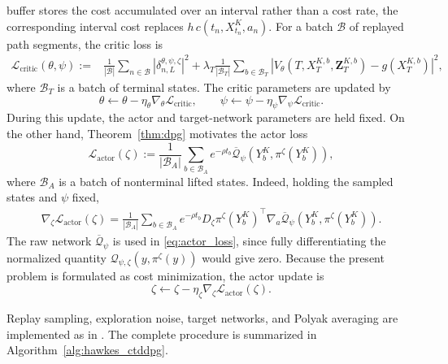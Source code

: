 \documentclass[11pt]{article}
\theoremstyle{remarkitalic}
\theoremstyle{remarkitalic}
\newcommand{\1}{\mathbf 1}
\begin{document}
buffer stores the cost accumulated over an interval rather than a cost
rate, the corresponding interval cost replaces $h\,c(t_n,X_{t_n}^K,a_n)$. For a batch $\mathcal B$ of replayed path segments, the critic loss is
\begin{align*}
    \mathcal L_{\mathrm{critic}}(\theta,\psi)
    :={}&
    \frac{1}{|\mathcal B|}
    \sum_{n\in\mathcal B}
    \left|
        \delta_{n,L}^{\theta,\psi,\zeta}
    \right|^2+
    \lambda_T
    \frac{1}{|\mathcal B_T|}
    \sum_{b\in\mathcal B_T}
    \left|
        V_\theta
        \left(
            T,X_T^{K,b},\mathbf Z_T^{K,b}
        \right)
        -
        g(X_T^{K,b})
    \right|^2,
\end{align*}
where $\mathcal B_T$ is a batch of terminal states. The critic
parameters are updated by
\[
    \theta
    \leftarrow
    \theta
    -
    \eta_\theta
    \nabla_\theta
    \mathcal L_{\mathrm{critic}},
    \qquad
    \psi
    \leftarrow
    \psi
    -
    \eta_\psi
    \nabla_\psi
    \mathcal L_{\mathrm{critic}}.
\]
During this update, the actor and target-network parameters are held
fixed. On the other hand, Theorem~\ref{thm:dpg} motivates the actor loss
\begin{equation}
\label{eq:actor_loss}
    \mathcal L_{\mathrm{actor}}(\zeta)
    :=
    \frac{1}{|\mathcal B_A|}
    \sum_{b\in\mathcal B_A}
    e^{-\rho t_b}
    \overline {\mathcal Q}_\psi
    \left(
        Y_b^K,
        \pi^\zeta(Y_b^K)
    \right),
\end{equation}
where $\mathcal B_A$ is a batch of nonterminal lifted states. Indeed,
holding the sampled states and $\psi$ fixed,
\[
\begin{aligned}
    \nabla_\zeta
    \mathcal L_{\mathrm{actor}}(\zeta)
    =
    \frac{1}{|\mathcal B_A|}
    \sum_{b\in\mathcal B_A}
    e^{-\rho t_b}
    D_\zeta\pi^\zeta(Y_b^K)^\top
    \nabla_a\overline {\mathcal Q}_\psi
    \left(
        Y_b^K,
        \pi^\zeta(Y_b^K)
    \right).
\end{aligned}
\]
The raw network $\overline {\mathcal Q}_\psi$ is used in
\eqref{eq:actor_loss}, since fully differentiating the normalized
quantity
${\mathcal Q}_{\psi,\zeta}(y,\pi^\zeta(y))$ would give zero. Because the present
problem is formulated as cost minimization, the actor update is
\[
    \zeta
    \leftarrow
    \zeta
    -
    \eta_\zeta
    \nabla_\zeta
    \mathcal L_{\mathrm{actor}}(\zeta).
\]

Replay sampling, exploration noise, target networks, and Polyak
averaging are implemented as in
\cite{ChengGuoZhang2026}. The complete procedure is summarized in
Algorithm~\ref{alg:hawkes_ctddpg}.
\end{document}

